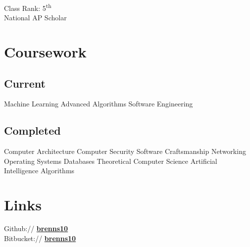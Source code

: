 \documentclass[letterpaper]{deedy-resume} %
\newcommand{\bul}{\textbullet{}}
\begin{document}
\begin{minipage}[t]{0.33\textwidth}
Class Rank: 5\textsuperscript{th} \\
National AP Scholar \\

\sectionspace %


\section{Coursework}

\subsection{Current}

Machine Learning \bul
Advanced Algorithms \bul
Software Engineering

\sectionspace %


\subsection{Completed}

Computer Architecture \bul
Computer Security \bul
Software Craftsmanship \bul
Networking \bul
Operating Systems \bul
Databases \bul
Theoretical Computer Science \bul
Artificial Intelligence \bul
Algorithms


\sectionspace %


\section{Links}

Github:// \href{https://github.com/brenns10}{\bf brenns10} \\
Bitbucket:// \href{https://bitbucket.org/brenns10}{\bf brenns10} \\

\sectionspace %



\end{minipage}
\end{document}
